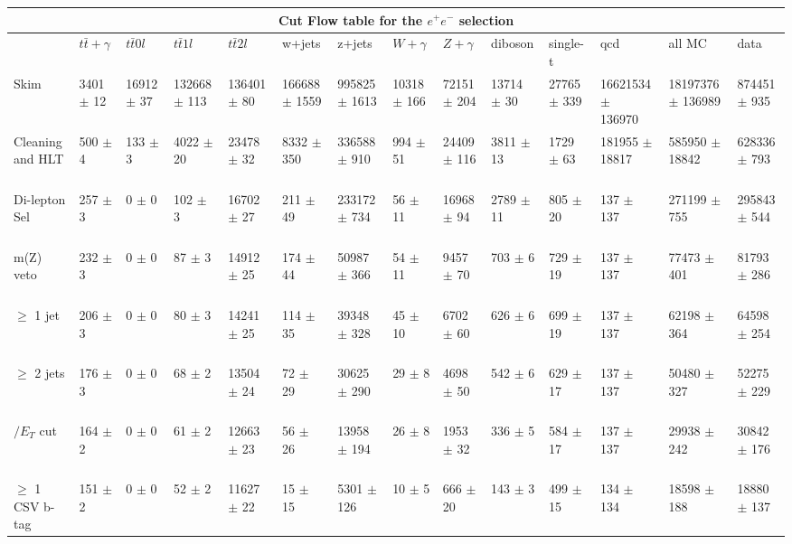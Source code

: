 \begin{table}
{\begin{tabular}{|l|l|l|l|l|l|l|l|l|l|l|l|l|l|}
\hline
\multicolumn{14}{|c|}{\textbf{Cut Flow table for the $e^+e^-$ selection}} \\
\hline
 & $t\bar{t}+\gamma$ & $t\bar{t} 0l$ & $t\bar{t} 1l$ & $t\bar{t} 2l$ & w+jets & z+jets & $W+\gamma$ & $Z+\gamma$ & diboson & single-t & qcd & all MC & data\\
 \hline
Skim & 3401 $\pm$ 12 \ & 16912 $\pm$ 37 \ & 132668 $\pm$ 113 \ & 136401 $\pm$ 80 \ & 166688 $\pm$ 1559 \ & 995825 $\pm$ 1613 \ & 10318 $\pm$ 166 \ & 72151 $\pm$ 204 \ & 13714 $\pm$ 30 \ & 27765 $\pm$ 339 \ & 16621534 $\pm$ 136970\ & 18197376 $\pm$ 136989 \ & 874451 $\pm$ 935 \\
Cleaning and HLT & 500 $\pm$ 4 \ & 133 $\pm$ 3 \ & 4022 $\pm$ 20 \ & 23478 $\pm$ 32 \ & 8332 $\pm$ 350 \ & 336588 $\pm$ 910 \ & 994 $\pm$ 51 \ & 24409 $\pm$ 116 \ & 3811 $\pm$ 13 \ & 1729 $\pm$ 63 \ & 181955 $\pm$ 18817\ & 585950 $\pm$ 18842 \ & 628336 $\pm$ 793 \\
Di-lepton Sel & 257 $\pm$ 3 \ & 0 $\pm$ 0 \ & 102 $\pm$ 3 \ & 16702 $\pm$ 27 \ & 211 $\pm$ 49 \ & 233172 $\pm$ 734 \ & 56 $\pm$ 11 \ & 16968 $\pm$ 94 \ & 2789 $\pm$ 11 \ & 805 $\pm$ 20 \ & 137 $\pm$ 137\ & 271199 $\pm$ 755 \ & 295843 $\pm$ 544 \\
m(Z) veto & 232 $\pm$ 3 \ & 0 $\pm$ 0 \ & 87 $\pm$ 3 \ & 14912 $\pm$ 25 \ & 174 $\pm$ 44 \ & 50987 $\pm$ 366 \ & 54 $\pm$ 11 \ & 9457 $\pm$ 70 \ & 703 $\pm$ 6 \ & 729 $\pm$ 19 \ & 137 $\pm$ 137\ & 77473 $\pm$ 401 \ & 81793 $\pm$ 286 \\
$\geq$ 1 jet & 206 $\pm$ 3 \ & 0 $\pm$ 0 \ & 80 $\pm$ 3 \ & 14241 $\pm$ 25 \ & 114 $\pm$ 35 \ & 39348 $\pm$ 328 \ & 45 $\pm$ 10 \ & 6702 $\pm$ 60 \ & 626 $\pm$ 6 \ & 699 $\pm$ 19 \ & 137 $\pm$ 137\ & 62198 $\pm$ 364 \ & 64598 $\pm$ 254 \\
$\geq$ 2 jets & 176 $\pm$ 3 \ & 0 $\pm$ 0 \ & 68 $\pm$ 2 \ & 13504 $\pm$ 24 \ & 72 $\pm$ 29 \ & 30625 $\pm$ 290 \ & 29 $\pm$ 8 \ & 4698 $\pm$ 50 \ & 542 $\pm$ 6 \ & 629 $\pm$ 17 \ & 137 $\pm$ 137\ & 50480 $\pm$ 327 \ & 52275 $\pm$ 229 \\
$\slash{E_{T}}$ cut & 164 $\pm$ 2 \ & 0 $\pm$ 0 \ & 61 $\pm$ 2 \ & 12663 $\pm$ 23 \ & 56 $\pm$ 26 \ & 13958 $\pm$ 194 \ & 26 $\pm$ 8 \ & 1953 $\pm$ 32 \ & 336 $\pm$ 5 \ & 584 $\pm$ 17 \ & 137 $\pm$ 137\ & 29938 $\pm$ 242 \ & 30842 $\pm$ 176 \\
$\geq$ 1 CSV b-tag & 151 $\pm$ 2 \ & 0 $\pm$ 0 \ & 52 $\pm$ 2 \ & 11627 $\pm$ 22 \ & 15 $\pm$ 15 \ & 5301 $\pm$ 126 \ & 10 $\pm$ 5 \ & 666 $\pm$ 20 \ & 143 $\pm$ 3 \ & 499 $\pm$ 15 \ & 134 $\pm$ 134\ & 18598 $\pm$ 188 \ & 18880 $\pm$ 137 \\

\end{tabular}}
\end{table}
